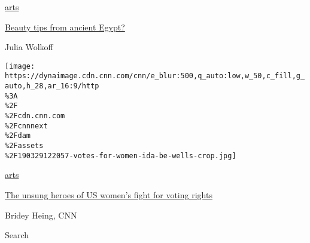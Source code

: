\href{/style/arts}{arts}

\href{/style/article/ancient-egypt-beauty-ritual-artsy/index.html}{Beauty
tips from ancient Egypt?}

Julia Wolkoff

\href{/style/article/votes-for-women-national-portrait-gallery/index.html}{}

\texttt{[image: https://dynaimage.cdn.cnn.com/cnn/e\_blur:500,q\_auto:low,w\_50,c\_fill,g\_auto,h\_28,ar\_16:9/http\\\%3A\\\%2F\\\%2Fcdn.cnn.com\\\%2Fcnnnext\\\%2Fdam\\\%2Fassets\\\%2F190329122057-votes-for-women-ida-be-wells-crop.jpg]}

\href{/style/arts}{arts}

\href{/style/article/votes-for-women-national-portrait-gallery/index.html}{The
unsung heroes of US women's fight for voting rights}

Bridey Heing, CNN

Search

